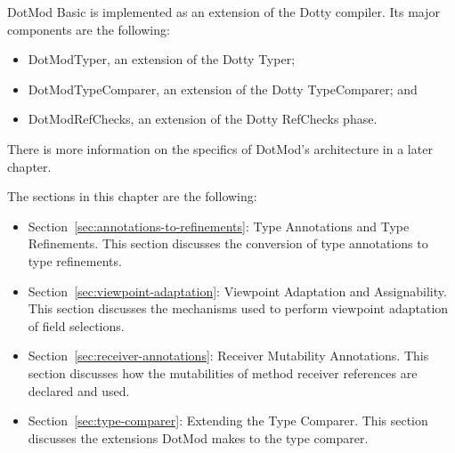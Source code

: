 \documentclass[11pt]{report}
\begin{document}
DotMod Basic is implemented as an extension of the Dotty compiler. Its major components are the following:
\begin{itemize}
\item DotModTyper, an extension of the Dotty Typer;
\item DotModTypeComparer, an extension of the Dotty TypeComparer; and
\item DotModRefChecks, an extension of the Dotty RefChecks phase.
\end{itemize}
There is more information on the specifics of DotMod's architecture in a later chapter.

The sections in this chapter are the following:
\begin{itemize}
\item Section~\ref{sec:annotations-to-refinements}: Type Annotations and Type Refinements. This section discusses the conversion of type annotations to type refinements.
\item Section~\ref{sec:viewpoint-adaptation}: Viewpoint Adaptation and Assignability. This section discusses the mechanisms used to perform viewpoint adaptation of field selections.
\item Section~\ref{sec:receiver-annotations}: Receiver Mutability Annotations. This section discusses how the mutabilities of method receiver references are declared and used.
\item Section~\ref{sec:type-comparer}: Extending the Type Comparer. This section discusses the extensions DotMod makes to the type comparer.
\end{itemize}





\begin{comment} TODO: move to introduction
The objective of DotMod Basic is to show how mutability information can be integrated into the standard Dotty type system.

The integrated approach is unusual. It is much more common in the side-effect-limitation domain to propose secondary type systems that are entirely orthogonal to the host language's primary type system. Although orthogonality is a nice property, the development and formalization of an entire secondary type system is a substantial amount of work.

The Checker Framework for Java can help reduce the effort required to implement a secondary type system. 

However, there does not seem


\end{comment}
\end{document}
